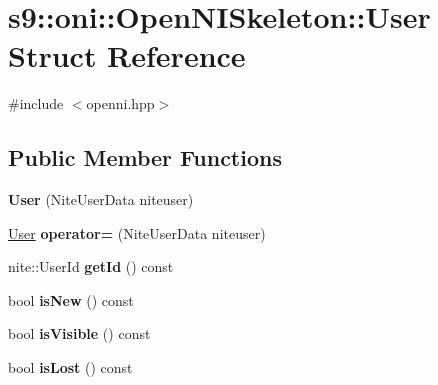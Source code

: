 \hypertarget{structs9_1_1oni_1_1OpenNISkeleton_1_1User}{\section{s9\-:\-:oni\-:\-:\-Open\-N\-I\-Skeleton\-:\-:\-User \-Struct \-Reference}
\label{structs9_1_1oni_1_1OpenNISkeleton_1_1User}
}


{\ttfamily \#include $<$openni.\-hpp$>$}

\subsection*{\-Public \-Member \-Functions}
\begin{DoxyCompactItemize}
\item 
\hypertarget{structs9_1_1oni_1_1OpenNISkeleton_1_1User_aad0633c347554cc94641eef4f7b84391}{{\bfseries \-User} (\-Nite\-User\-Data niteuser)}\label{structs9_1_1oni_1_1OpenNISkeleton_1_1User_aad0633c347554cc94641eef4f7b84391}

\item 
\hypertarget{structs9_1_1oni_1_1OpenNISkeleton_1_1User_af1094f445bc811b059a156ccb8304253}{\hyperlink{structs9_1_1oni_1_1OpenNISkeleton_1_1User}{\-User} {\bfseries operator=} (\-Nite\-User\-Data niteuser)}\label{structs9_1_1oni_1_1OpenNISkeleton_1_1User_af1094f445bc811b059a156ccb8304253}

\item 
\hypertarget{structs9_1_1oni_1_1OpenNISkeleton_1_1User_aff27937033e751dab47c1eecb39f413d}{nite\-::\-User\-Id {\bfseries get\-Id} () const }\label{structs9_1_1oni_1_1OpenNISkeleton_1_1User_aff27937033e751dab47c1eecb39f413d}

\item 
\hypertarget{structs9_1_1oni_1_1OpenNISkeleton_1_1User_a61e56cd778ab0fe4c5fdd6ebd2aa9189}{bool {\bfseries is\-New} () const }\label{structs9_1_1oni_1_1OpenNISkeleton_1_1User_a61e56cd778ab0fe4c5fdd6ebd2aa9189}

\item 
\hypertarget{structs9_1_1oni_1_1OpenNISkeleton_1_1User_acf864a2a10f30adb2d03a3ab845701e8}{bool {\bfseries is\-Visible} () const }\label{structs9_1_1oni_1_1OpenNISkeleton_1_1User_acf864a2a10f30adb2d03a3ab845701e8}

\item 
\hypertarget{structs9_1_1oni_1_1OpenNISkeleton_1_1User_aa0fcbee76392ccdb926031ee251b2151}{bool {\bfseries is\-Lost} () const }\label{structs9_1_1oni_1_1OpenNISkeleton_1_1User_aa0fcbee76392ccdb926031ee251b2151}


\end{DoxyCompactItemize}
